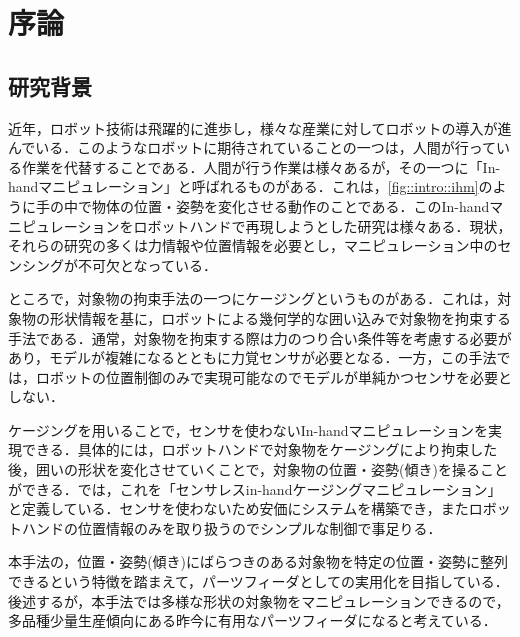 \documentclass[a4paper,twoside,12pt,papersize, dvipdfmx]{iirthesis}
\begin{document}
    \newcommand{\figref}[1]{\figurename\ref{#1}}
    \newcommand{\tabref}[1]{\tablename\ref{#1}}
    \renewcommand{\eqref}[1]{式~(\ref{#1})}
    \newcommand{\chapref}[1]{\ref{#1}章}
    \newcommand{\secref}[1]{\ref{#1}節}
    \newcommand{\ssecref}[1]{\ref{#1}項}
    \newcommand{\appref}[1]{付録\ref{#1}}
\fi


\chapter{序論}\label{chap::intro}
\minitoc

\section{研究背景}\label{sec::intro::background}
近年，ロボット技術は飛躍的に進歩し，様々な産業に対してロボットの導入が進んでいる．このようなロボットに期待されていることの一つは，人間が行っている作業を代替することである．人間が行う作業は様々あるが，その一つに「In-handマニピュレーション」と呼ばれるものがある．これは，\figref{fig::intro::ihm}のように手の中で物体の位置・姿勢を変化させる動作のことである．このIn-handマニピュレーションをロボットハンドで再現しようとした研究は様々ある．現状，それらの研究の多くは力情報や位置情報を必要とし，マニピュレーション中のセンシングが不可欠となっている．\par

ところで，対象物の拘束手法の一つにケージング\cite{rimon1999}というものがある．これは，対象物の形状情報を基に，ロボットによる幾何学的な囲い込みで対象物を拘束する手法である．通常，対象物を拘束する際は力のつり合い条件等を考慮する必要があり，モデルが複雑になるとともに力覚センサが必要となる．一方，この手法では，ロボットの位置制御のみで実現可能なのでモデルが単純かつセンサを必要としない．\par

ケージングを用いることで，センサを使わないIn-handマニピュレーションを実現できる．具体的には，ロボットハンドで対象物をケージングにより拘束した後，囲いの形状を変化させていくことで，対象物の位置・姿勢(傾き)を操ることができる．\cite{komiyama2021}では，これを「センサレスin-handケージングマニピュレーション」と定義している．センサを使わないため安価にシステムを構築でき，またロボットハンドの位置情報のみを取り扱うのでシンプルな制御で事足りる．\par

本手法の，位置・姿勢(傾き)にばらつきのある対象物を特定の位置・姿勢に整列できるという特徴を踏まえて，パーツフィーダとしての実用化を目指している．後述するが，本手法では多様な形状の対象物をマニピュレーションできるので，多品種少量生産傾向にある昨今に有用なパーツフィーダになると考えている．
\end{document}
